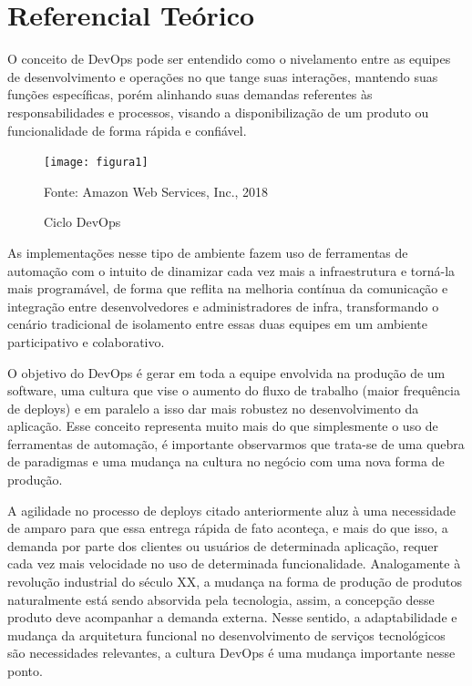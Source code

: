 
\chapter{Referencial Teórico}\label{referencial_teorico}


O conceito de DevOps pode ser entendido como o nivelamento entre as equipes de desenvolvimento e operações no que tange suas interações, mantendo suas funções específicas, porém alinhando suas demandas referentes às responsabilidades e processos, visando a disponibilização de um produto ou funcionalidade de forma rápida e confiável.\cite{gartnerglossario}

\begin{figure}[htb] %
	\centering
	\texttt{[image: figura1]}
	\caption{Ciclo DevOps}
	Fonte: Amazon Web Services, Inc., 2018
	\label{fig:figura1}
\end{figure}

As implementações nesse tipo de ambiente fazem uso de ferramentas de automação com o intuito de dinamizar cada vez mais a infraestrutura e torná-la mais programável, de forma que reflita na melhoria contínua da comunicação e integração entre desenvolvedores e administradores de infra, transformando o cenário tradicional de isolamento entre essas duas equipes em um ambiente participativo e colaborativo.\cite{costa}

O objetivo do DevOps é gerar em toda a equipe envolvida na produção de um software, uma cultura que vise o aumento do fluxo de trabalho (maior frequência de deploys) e em paralelo a isso dar mais robustez no desenvolvimento da aplicação. Esse conceito representa muito mais do que simplesmente o uso de ferramentas de automação, é importante observarmos que trata-se de uma quebra de paradigmas e uma mudança na cultura no negócio com uma nova forma de produção.\cite{sato2014devops}

A agilidade no processo de deploys citado anteriormente aluz à uma necessidade de amparo para que essa entrega rápida de fato aconteça, e mais do que isso, a demanda por parte dos clientes ou usuários de determinada aplicação, requer cada vez mais velocidade no uso de determinada funcionalidade. Analogamente à revolução industrial do século XX, a mudança na forma de produção de produtos naturalmente está sendo absorvida pela tecnologia, assim, a concepção desse produto deve acompanhar a demanda externa. Nesse sentido, a adaptabilidade e mudança da arquitetura funcional no desenvolvimento de serviços tecnológicos são necessidades relevantes, a cultura DevOps é uma mudança importante nesse ponto.\cite{ibmdevops}

